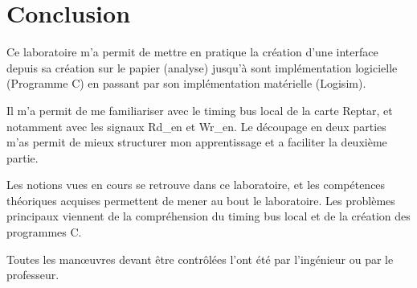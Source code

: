\section{Conclusion}
\par
Ce laboratoire m'a permit de mettre en pratique la création d'une interface depuis sa création sur le papier (analyse) jusqu'à sont implémentation logicielle (Programme C) en passant par son implémentation matérielle (Logisim).\\\par Il m'a permit de me familiariser avec le timing bus local de la carte Reptar, et notamment avec les signaux Rd\_en et Wr\_en. Le découpage en deux parties m'as permit de mieux structurer mon apprentissage et a faciliter la deuxième partie. \\\par Les notions vues en cours se retrouve dans ce laboratoire, et les compétences théoriques acquises permettent de mener au bout le laboratoire. Les problèmes principaux viennent de la compréhension du timing bus local et de la création des programmes C.\\\par Toutes les manœuvres devant être contrôlées l'ont été par l'ingénieur ou par le professeur.
